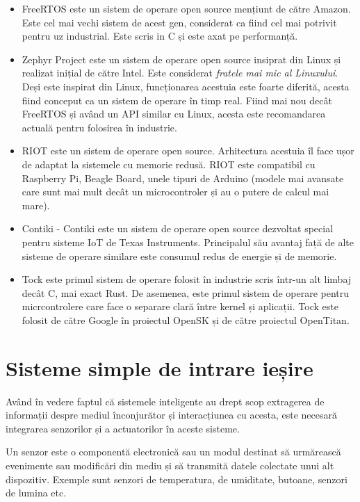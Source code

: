 \begin{itemize}
  \item FreeRTOS este un sistem de operare open source mențiunt de către Amazon. 
    Este cel mai vechi sistem de acest gen, considerat ca fiind cel mai potrivit
    pentru uz industrial. Este scris in C și este axat pe performanță.
  \item Zephyr Project este un sistem de operare open source insiprat din Linux și realizat
    inițial de către Intel. Este considerat \textit{fratele mai mic al Linuxului}.
    Deși este inspirat din Linux, funcționarea acestuia este foarte diferită, acesta fiind
    conceput ca un sistem de operare în timp real. Fiind mai nou decât FreeRTOS și având 
    un API similar cu Linux, acesta este recomandarea actuală pentru folosirea în industrie.
  \item RIOT este un sistem de operare open source. Arhitectura acestuia îl face ușor de
    adaptat la sistemele cu memorie redusă. RIOT este compatibil cu
    Raspberry Pi, Beagle Board, unele tipuri de Arduino (modele mai
    avansate care sunt mai mult decât un microcontroler și au o
    putere de calcul mai mare).
  \item Contiki - Contiki este un sistem de operare open source dezvoltat
    special pentru sisteme IoT de Texas Instruments. Principalul său
    avantaj față de alte sisteme de operare similare este consumul
    redus de energie și de memorie.
  \item Tock este primul sistem de operare folosit în industrie scris într-un alt
    limbaj decât C, mai exact Rust. De asemenea, este primul sistem de operare
    pentru micrcontrolere care face o separare clară între kernel și aplicații.
    Tock este folosit de către Google în proiectul OpenSK și de către 
    proiectul OpenTitan.
\end{itemize}

\section{Sisteme simple de intrare ieșire}
\label{sec:embed:io}

Având în vedere faptul că sistemele inteligente au drept scop extragerea de
informații despre mediul înconjurător și interacțiunea cu acesta, este necesară
integrarea senzorilor și a actuatorilor în aceste sisteme.

Un senzor este o componentă electronică sau un modul destinat să urmărească
evenimente sau modificări din mediu și să transmită datele colectate unui alt
dispozitiv. Exemple sunt senzori de temperatura, de umiditate, butoane, senzori
de lumina etc.

